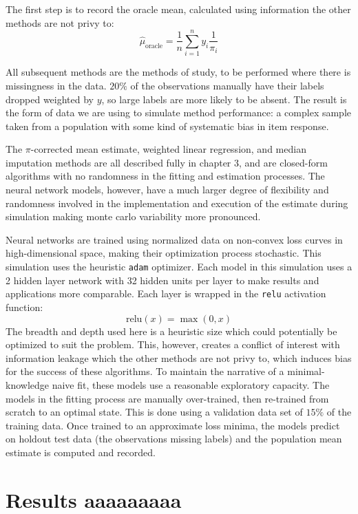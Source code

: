 \documentclass[12pt,twoside]{reedthesis}
\begin{document}
The first step is to record the oracle mean, calculated using
information the other methods are not privy to: \[
\hat \mu_{\text{oracle}} = \frac{1}{n} \sum_{i=1}^n y_i \frac{1}{\pi_i}
\]

All subsequent methods are the methods of study, to be performed where
there is missingness in the data. \(20\%\) of the observations manually
have their labels dropped weighted by \(y\), so large labels are more
likely to be absent. The result is the form of data we are using to
simulate method performance: a complex sample taken from a population
with some kind of systematic bias in item response.

The \(\pi\)-corrected mean estimate, weighted linear regression, and
median imputation methods are all described fully in chapter 3, and are
closed-form algorithms with no randomness in the fitting and estimation
processes. The neural network models, however, have a much larger degree
of flexibility and randomness involved in the implementation and
execution of the estimate during simulation making monte carlo
variability more pronounced.

Neural networks are trained using normalized data on non-convex loss
curves in high-dimensional space, making their optimization process
stochastic. This simulation uses the heuristic \texttt{adam} optimizer.
Each model in this simulation uses a 2 hidden layer network with 32
hidden units per layer to make results and applications more comparable.
Each layer is wrapped in the \texttt{relu} activation function: \[
\text{relu}(x) = \max(0,x)
\] The breadth and depth used here is a heuristic size which could
potentially be optimized to suit the problem. This, however, creates a
conflict of interest with information leakage which the other methods
are not privy to, which induces bias for the success of these
algorithms. To maintain the narrative of a minimal-knowledge naive fit,
these models use a reasonable exploratory capacity. The models in the
fitting process are manually over-trained, then re-trained from scratch
to an optimal state. This is done using a validation data set of
\(15\%\) of the training data. Once trained to an approximate loss
minima, the models predict on holdout test data (the observations
missing labels) and the population mean estimate is computed and
recorded.

\section{Results aaaaaaaaa}\label{results-aaaaaaaaa}
\end{document}
